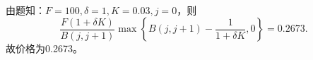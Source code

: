 \begin{enumerate}
\begin{center}
    \end{center}
    \sol\\
    由题知：$F=100,\delta=1,K=0.03,j=0$，则
    \[\frac{F(1+\delta K)}{B(j,j+1)}\max\left\{B(j,j+1)-\frac{1}{1+\delta K},0\right\}=0.2673.\]
    故价格为0.2673。
\end{enumerate}
\clearpage